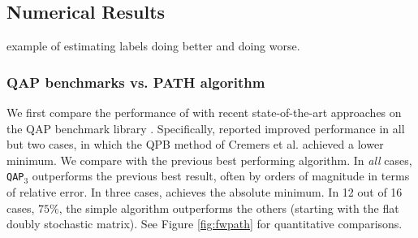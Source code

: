 \documentclass[10pt,journal,cspaper,compsoc]{IEEEtran}
\begin{document}
\subsection{Numerical Results} %
\label{sub:numerical_results}

example of estimating labels doing better and doing worse.



\subsubsection{QAP benchmarks vs. PATH algorithm}

We first compare the performance of \qapn with recent state-of-the-art approaches on the QAP benchmark library \cite{Burkard1997}.  Specifically, \cite{Zaslavskiy2009} reported improved performance in all but two cases, in which the QPB method of Cremers et al. \cite{Schellewald2001} achieved a lower minimum.  We compare \qapn with the previous best performing algorithm.  In \emph{all} cases, \texttt{QAP}$_3$ outperforms the previous best result, often by orders of magnitude in terms of relative error. In three cases, \qapb achieves the absolute minimum.  In 12 out of 16 cases, $75\%$, the simple \qapa algorithm outperforms the others (starting with the flat doubly stochastic matrix).  See Figure \ref{fig:fwpath} for quantitative comparisons.
\end{document}

